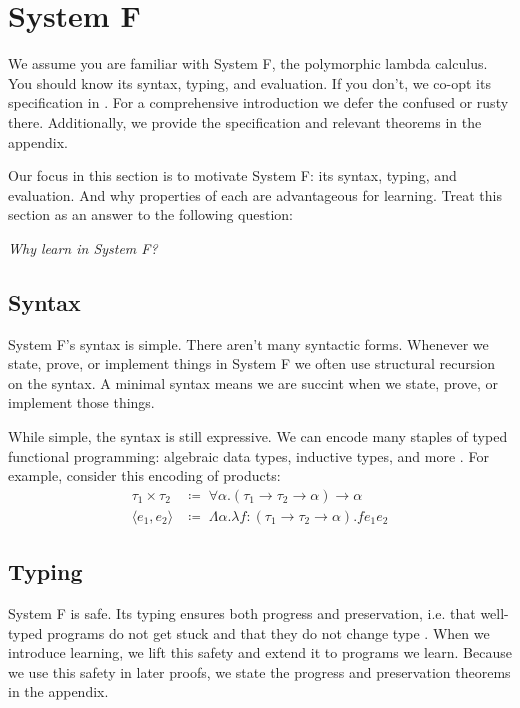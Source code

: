 \documentclass[sigplan,10pt]{acmart}
\theoremstyle{mytheoremstyle}
\begin{document}
\section{System F}
We assume you are familiar with System F, the polymorphic lambda calculus. You should know its syntax, typing, and evaluation. If you don't, we co-opt its specification in \cite{pierce2002types}. For a comprehensive introduction we defer the confused or rusty there. Additionally, we provide the specification and relevant theorems in the appendix.

Our focus in this section is to motivate System F: its syntax, typing, and evaluation. And why properties of each are advantageous for learning. Treat this section as an answer to the following question: 
\begin{displayquote}
\textit{Why learn in System F?}
\centering
\end{displayquote}
\subsection{Syntax}

System F's syntax is simple. There aren't many syntactic forms. Whenever we state, prove, or implement things in System F we often use structural recursion on the syntax. A minimal syntax means we are succint when we state, prove, or implement those things.

While simple, the syntax is still expressive. We can encode many staples of typed functional programming: algebraic data types, inductive types, and more \cite{pierce2002types}. For example, consider this encoding of products:
\begin{align*}
\tau_1 \times \tau_2 \,&\coloneqq\; \forall \alpha.(\tau_1 \to \tau_2 \to \alpha) \to \alpha\\
\langle e_1,e_2 \rangle &\coloneqq\; \Lambda \alpha.\lambda f\!:\!(\tau_1 \to \tau_2 \to \alpha).fe_1e_2 
\end{align*}

\subsection{Typing}
System F is safe. Its typing ensures both progress and preservation, i.e. that well-typed programs do not get stuck and that they do not change type \cite{pierce2002types}. When we introduce learning, we lift this safety and extend it to programs we learn. Because we use this safety in later proofs, we state the progress and preservation theorems in the appendix.
\end{document}
